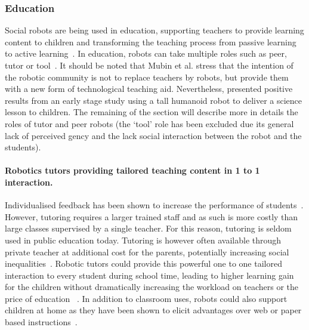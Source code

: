 \subsubsection{Education} 
	Social robots are being used in education, supporting teachers to provide learning content to children and transforming the teaching process from passive learning to active learning~\citep{linder2001facilitating}. In education, robots can take multiple roles such as peer, tutor or tool~\citep{mubin2013review}. It should be noted that Mubin et al. stress that the intention of the robotic community is not to replace teachers by robots, but provide them with a new form of technological teaching aid. Nevertheless, \cite{verner2016science} presented positive results from an early stage study using a tall humanoid robot to deliver a science lesson to children. The remaining of the section will describe more in details the roles of tutor and peer robots (the `tool' role has been excluded due its general lack of perceived gency and the lack social interaction between the robot and the students).
	
	\paragraph{Robotics tutors providing tailored teaching content in 1 to 1 interaction.} 
	Individualised feedback has been shown to increase the performance of students~\citep{cohen1982educational,bloom19842}. However, tutoring requires a larger trained staff and as such is more costly than large classes supervised by a single teacher. For this reason, tutoring is seldom used in public education today. Tutoring is however often available through private teacher at additional cost for the parents, potentially increasing social inequalities~\citep{bray2009confronting}. Robotic tutors could provide this powerful one to one tailored interaction to every student during school time, leading to higher learning gain for the children without dramatically increasing the workload on teachers or the price of education ~\citep{kanda2004interactive,leyzberg2012physical,kennedy2016social,gordon2016affective}. In addition to classroom uses, robots could also support children at home as they have been shown to elicit advantages over web or paper based instructions~\citep{han2005educational}. 
	

